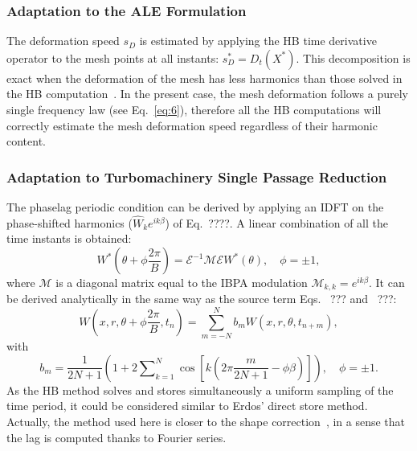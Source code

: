 \subsubsection{Adaptation to the ALE Formulation}
\label{sec:adapt-ale-form}

The deformation speed $s_D$ is estimated by applying the HB time
derivative operator to the mesh points at all instants:
$s_D^*=D_t(X^*)$. This decomposition is exact when the
  deformation of the mesh has less harmonics than those solved in the
  HB computation~\cite{Dufour2010}. In the present case, the mesh
  deformation follows a purely single frequency law (see
  Eq.~\eqref{eq:6}), therefore all the HB computations will correctly
  estimate the mesh deformation speed regardless of their harmonic content.


\subsubsection{Adaptation to Turbomachinery Single Passage
    Reduction}
\label{sec:Adptatreduction}

The phaselag periodic condition can be derived by applying an
  IDFT on the phase-shifted harmonics ($\widehat{W}_ke^{ik\beta}$) of
  Eq.~????. A linear
combination of all the time instants is obtained:
\begin{equation}
  W^*\left(\theta+\phi\frac{2\pi}{B}\right)=\mathcal{E}^{-1}\mathcal{M}\mathcal{E}W^*(\theta),\quad \phi=\pm 1,
\end{equation}
where $\mathcal{M}$ is a diagonal matrix equal to the IBPA modulation
$\mathcal{M}_{k,k}=e^{i k\beta}$. It can be derived
analytically in the same way as the source term Eqs.~ ???
and~ ???:
\begin{equation}
  W\left(x, r, \theta+\phi\frac{2\pi}{B}, t_n\right) =\sum_{m=-N}^N
  b_mW(x, r, \theta, t_{n+m}), 
\end{equation}
with
\begin{equation}
  b_m=\frac{1}{2N+1}\left(1+2\sum\nolimits_{k=1}^N\cos\left[k\left(2\pi
        \frac{m}{2N+1}-\phi \beta\right)\right]\right),\quad \phi=\pm 1.
\end{equation}
As the HB method solves and stores simultaneously a uniform sampling
of the time period, it could be considered similar to Erdos' direct
store method. Actually, the method used here is closer to the shape
correction~\cite{He1990}, in a sense that the lag is
computed thanks to Fourier series.%

